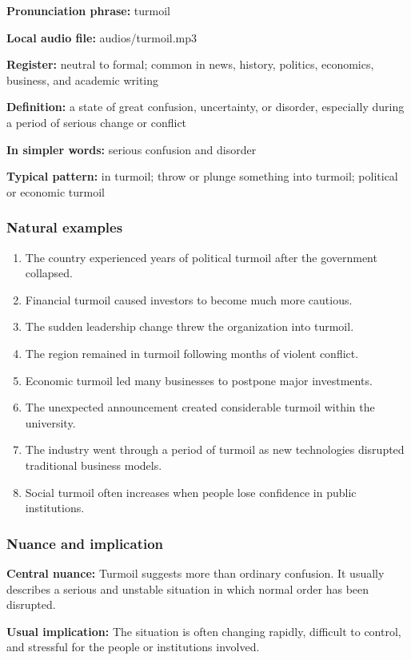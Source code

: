 \documentclass[11pt]{article}
\begin{document}
\textbf{Pronunciation phrase:} turmoil

\textbf{Local audio file:} audios/turmoil.mp3

\textbf{Register:} neutral to formal; common in news, history, politics, economics, business, and academic writing

\textbf{Definition:} a state of great confusion, uncertainty, or disorder, especially during a period of serious change or conflict

\textbf{In simpler words:} serious confusion and disorder

\textbf{Typical pattern:} in turmoil; throw or plunge something into turmoil; political or economic turmoil

\subsubsection{Natural examples}
\begin{enumerate}
  \item The country experienced years of political turmoil after the government collapsed.
  \item Financial turmoil caused investors to become much more cautious.
  \item The sudden leadership change threw the organization into turmoil.
  \item The region remained in turmoil following months of violent conflict.
  \item Economic turmoil led many businesses to postpone major investments.
  \item The unexpected announcement created considerable turmoil within the university.
  \item The industry went through a period of turmoil as new technologies disrupted traditional business models.
  \item Social turmoil often increases when people lose confidence in public institutions.
\end{enumerate}

\subsubsection{Nuance and implication}
\textbf{Central nuance:} Turmoil suggests more than ordinary confusion. It usually describes a serious and unstable situation in which normal order has been disrupted.

\textbf{Usual implication:} The situation is often changing rapidly, difficult to control, and stressful for the people or institutions involved.
\end{document}
